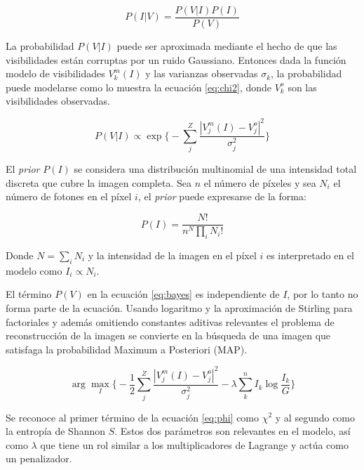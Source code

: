 \begin{equation}
P(I|V) = \frac{P(V|I)P(I)}{P(V)}
\label{eq:bayes}
\end{equation}

La probabilidad $P(V|I)$ puede ser aproximada mediante el hecho de que las visibilidades están corruptas por un ruido Gaussiano. Entonces dada la función modelo de visibilidades $V_{k}^{m}(I)$ y las varianzas observadas $\sigma_k$, la probabilidad puede modelarse como lo muestra la ecuación \ref{eq:chi2}, donde $V_{k}^{o}$ son las visibilidades observadas.

\begin{equation}
 P(V|I) \propto \exp\biggl\{-\sum_j^{Z}{\frac{|V^m_j(I)-V^o_j|^{2}}{\sigma_j^{2}}}\biggr\}
 \label{eq:chi2}
\end{equation}

El \textit{prior} $P(I)$ se considera una distribución multinomial de una intensidad total discreta que cubre la imagen completa. Sea $n$ el número de píxeles y sea $N_{i}$ el número de fotones en el píxel $i$, el \textit{prior} puede expresarse de la forma:

\begin{equation}
P(I) = \frac{N!}{n^N\prod_i{N_i!}}
\label{eq:imageProb}
\end{equation}

Donde $N=\sum_i N_{i}$ y la intensidad de la imagen en el píxel $i$ es interpretado en el modelo como $I_{i} \propto N_{i}$.

El término $P(V)$ en la ecuación \ref{eq:bayes} es independiente de $I$, por lo tanto no forma parte de la ecuación. Usando logaritmo y la aproximación de Stirling para factoriales y además omitiendo constantes aditivas relevantes el problema de reconstrucción de la imagen se convierte en la búsqueda de una imagen que satisfaga la probabilidad Maximum a Posteriori (MAP).

\begin{equation}
\arg \max_{I} \biggl\{
            -\frac{1}{2} \sum_j^{Z}{ \frac{|V^m_j(I)-V^o_j|^{2}}{\sigma_j^2} }-
            \lambda \sum_k^{n}{I_k \log{\frac{I_k}{G}}}
            \biggr\}
\label{eq:phi}
\end{equation}

Se reconoce al primer término de la ecuación \ref{eq:phi} como $\chi^{2}$ y al segundo como la entropía de Shannon $S$. Estos dos parámetros son relevantes en el modelo, así como $\lambda$ que tiene un rol similar a los multiplicadores de Lagrange y actúa como un penalizador.

